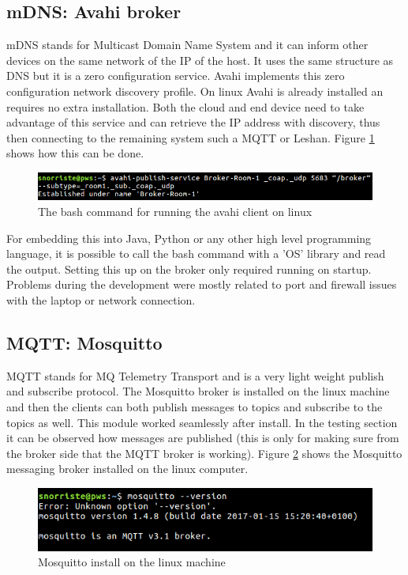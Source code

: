 \documentclass[11pt]{article}
\begin{document}


\subsection{mDNS: Avahi broker}
mDNS stands for Multicast Domain Name System and it can inform other devices on the same network of the IP of the host. It uses the same structure as DNS but it is a zero configuration service. Avahi implements this zero configuration network discovery profile. On linux Avahi is already installed an requires no extra installation. Both the cloud and end device need to take advantage of this service and can retrieve the IP address with discovery, thus then connecting to the remaining system such a MQTT or Leshan. Figure \ref{fig:avahi} shows how this can be done.

\begin{figure}[h]
	\begin{center}
		\includegraphics[width=1.1\linewidth]{img/avahi}
		\caption{The bash command for running the avahi client on linux}
		\label{fig:avahi}
	\end{center}
\end{figure}


For embedding this into Java, Python or any other high level programming language, it is possible to call the bash command with a 'OS' library and read the output. Setting this up on the broker only required running on startup. Problems during the development were mostly related to port and firewall issues with the laptop or network connection.

\subsection{MQTT: Mosquitto}
MQTT stands for MQ Telemetry Transport and is a very light weight publish and subscribe protocol. The Mosquitto broker is installed on the linux machine and then the clients can both publish messages to topics and subscribe to the topics as well. This module worked seamlessly after install. In the testing section it can be observed how messages are published (this is only for making sure from the broker side that the MQTT broker is working). Figure \ref{fig:mqtt2} shows the Mosquitto messaging broker installed on the linux computer.

\begin{figure}[h]
	\begin{center}
		\includegraphics[width=.8\linewidth]{img/mqtt2}
		\caption{Mosquitto install on the linux machine}
		\label{fig:mqtt2}
	\end{center}
\end{figure}







\pagebreak
\printbibliography
\end{document}
